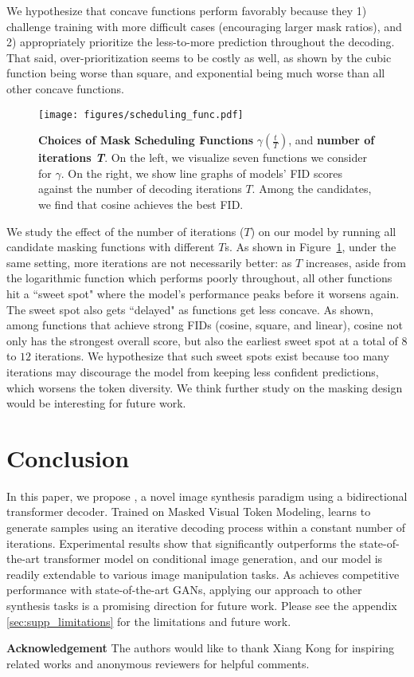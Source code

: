 We hypothesize that concave functions perform favorably because they 1) challenge training with more difficult cases (\ie encouraging larger mask ratios), and 2) appropriately prioritize the less-to-more prediction throughout the decoding.
That said, over-prioritization seems to be costly as well, as shown by the cubic function being worse than square, and exponential being much worse than all other concave functions.

\begin{figure}[!t]
    \centering
\texttt{[image: figures/scheduling\_func.pdf]}
    \vspace{-6mm}
    \caption{\textbf{Choices of Mask Scheduling Functions} $\gamma (\frac{t}{T})$, and 
    \textbf{number of iterations \textit{T}}. On the left, we visualize seven functions we consider for $\gamma$. On the right, we show line graphs of models' FID scores against the number of decoding iterations $T$. Among the candidates, we find that cosine achieves the best FID.}
    \label{fig:scheduling}
    \vspace{-3mm}
\end{figure}
We study the effect of the number of iterations ($T$) on our model by running all candidate masking functions with different $T$s. As shown in Figure~\ref{fig:scheduling}, under the same setting, more iterations are not necessarily better: as $T$ increases, aside from the logarithmic function which performs poorly throughout, all other functions hit a ``sweet spot" where the model's performance peaks before it worsens again. The sweet spot also gets ``delayed" as functions get less concave. As shown, among functions that achieve strong FIDs (\ie cosine, square, and linear), cosine not only has the strongest overall score, but also the earliest sweet spot at a total of $8$ to $12$ iterations.
We hypothesize that such sweet spots exist because too many iterations may discourage the model from keeping less confident predictions, which worsens the token diversity. We think further study on the masking design would be interesting for future work.
\section{Conclusion}

In this paper, we propose \model, a novel image synthesis paradigm using a bidirectional transformer decoder. Trained on Masked Visual Token Modeling, \model learns to generate samples using an iterative decoding process within a constant number of iterations. Experimental results show that \model significantly outperforms the state-of-the-art transformer model on conditional image generation, and our model is readily extendable to various image manipulation tasks. As \model achieves competitive performance with state-of-the-art GANs, applying our approach to other synthesis tasks is a promising direction for future work. Please see the appendix \ref{sec:supp_limitations} for the limitations and future work.

\noindent \textbf{Acknowledgement} 
The authors would like to thank Xiang Kong for inspiring related works and anonymous reviewers for helpful comments.

